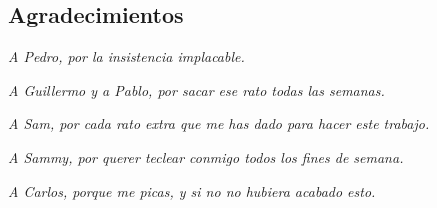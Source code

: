 \documentclass[12pt,a4paper]{report}
\begin{document}
\begin{flushright}
  \section*{Agradecimientos}

  \emph{A Pedro, por la insistencia implacable.}

  \emph{A Guillermo y a Pablo, por sacar ese rato todas las semanas.}

  \emph{A Sam, por cada rato extra que me has dado para hacer este trabajo.}

  \emph{A Sammy, por querer teclear conmigo todos los fines de semana.}

  \emph{A Carlos, porque me picas, y si no no hubiera acabado esto.}

\end{flushright}

\clearpage

\tableofcontents
\listoffigures
\listoftables

\clearpage

















\end{document}
